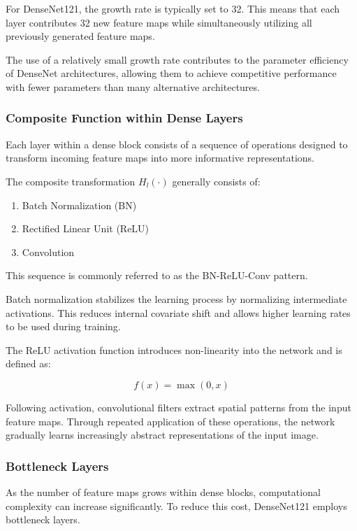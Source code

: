 For DenseNet121, the growth rate is typically set to 32. This means that each layer contributes 32 new feature maps while simultaneously utilizing all previously generated feature maps.

The use of a relatively small growth rate contributes to the parameter efficiency of DenseNet architectures, allowing them to achieve competitive performance with fewer parameters than many alternative architectures.

\subsubsection{Composite Function within Dense Layers}

Each layer within a dense block consists of a sequence of operations designed to transform incoming feature maps into more informative representations.

The composite transformation $H_l(\cdot)$ generally consists of:

\begin{enumerate}
	\item Batch Normalization (BN)
	\item Rectified Linear Unit (ReLU)
	\item Convolution
\end{enumerate}

This sequence is commonly referred to as the BN-ReLU-Conv pattern.

Batch normalization stabilizes the learning process by normalizing intermediate activations. This reduces internal covariate shift and allows higher learning rates to be used during training.

The ReLU activation function introduces non-linearity into the network and is defined as:

\begin{equation}
	f(x) = \max(0,x)
\end{equation}

Following activation, convolutional filters extract spatial patterns from the input feature maps. Through repeated application of these operations, the network gradually learns increasingly abstract representations of the input image.

\subsubsection{Bottleneck Layers}

As the number of feature maps grows within dense blocks, computational complexity can increase significantly. To reduce this cost, DenseNet121 employs bottleneck layers.

